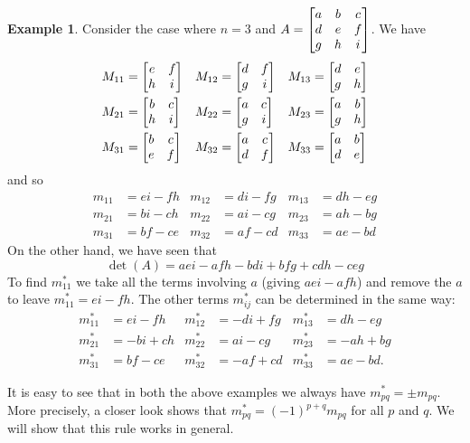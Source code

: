 \documentclass[reqno]{amsart}
\theoremstyle{definition}
\newtheorem{example}[theorem]{Example}
\begin{document}
\begin{example}\label{eg-minors-three}
 Consider the case where $n=3$ and
 $A=\left[\begin{matrix} a&b&c\\
         d&e&f\\
         g&h&i
    \end{matrix}\right]$.
 We have
 \begin{align*}
  M_{11} &= \left[\begin{matrix} e&f\\ h&i\end{matrix}\right] &
  M_{12} &= \left[\begin{matrix} d&f\\ g&i\end{matrix}\right] &
  M_{13} &= \left[\begin{matrix} d&e\\ g&h\end{matrix}\right] \\
  M_{21} &= \left[\begin{matrix} b&c\\ h&i\end{matrix}\right] &
  M_{22} &= \left[\begin{matrix} a&c\\ g&i\end{matrix}\right] &
  M_{23} &= \left[\begin{matrix} a&b\\ g&h\end{matrix}\right] \\
  M_{31} &= \left[\begin{matrix} b&c\\ e&f\end{matrix}\right] &
  M_{32} &= \left[\begin{matrix} a&c\\ d&f\end{matrix}\right] &
  M_{33} &= \left[\begin{matrix} a&b\\ d&e\end{matrix}\right]
 \end{align*}
 and so
 \begin{align*}
  m_{11} &= ei-fh &
  m_{12} &= di-fg &
  m_{13} &= dh-eg \\
  m_{21} &= bi-ch &
  m_{22} &= ai-cg &
  m_{23} &= ah-bg \\
  m_{31} &= bf-ce &
  m_{32} &= af-cd &
  m_{33} &= ae-bd
 \end{align*}
 On the other hand, we have seen that
 \[ \det(A) = aei-afh-bdi+bfg+cdh-ceg \]
 To find $m^*_{11}$ we take all the terms involving $a$ (giving
 $aei-afh$) and remove the $a$ to leave $m^*_{11}=ei-fh$.  The other
 terms $m^*_{ij}$ can be determined in the same way:
 \begin{align*}
  m^*_{11} &=  ei-fh & m^*_{12} &= -di+fg & m^*_{13} &=  dh-eg \\
  m^*_{21} &= -bi+ch & m^*_{22} &=  ai-cg & m^*_{23} &= -ah+bg \\
  m^*_{31} &=  bf-ce & m^*_{32} &= -af+cd & m^*_{33} &=  ae-bd.
 \end{align*}
\end{example}

It is easy to see that in both the above examples we always have
$m^*_{pq}=\pm m_{pq}$.  More precisely, a closer look shows that
$m^*_{pq}=(-1)^{p+q}m_{pq}$ for all $p$ and $q$.  We will show that
this rule works in general.
\end{document}
